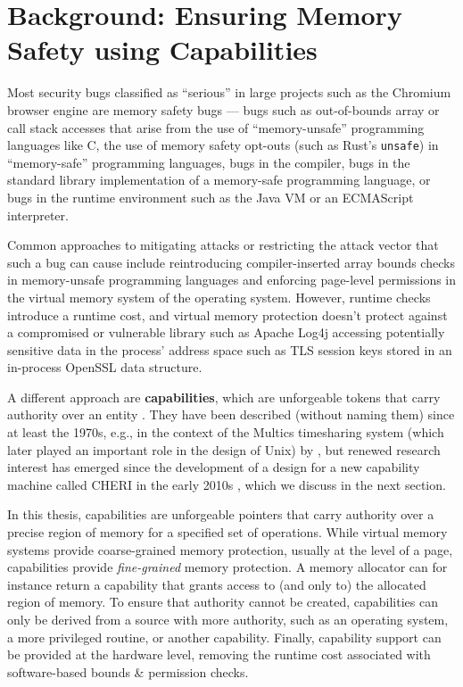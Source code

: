 \documentclass[main.tex]{subfiles}
\begin{document}
\onlyinsubfile{\mainmatter{}}

\chapter{Background: Ensuring Memory Safety using Capabilities} \label{ch:cheri}
Most security bugs classified as \enquote{serious} in large projects such as the Chromium browser engine are memory safety bugs \citep{chromium} — bugs such as out-of-bounds array or call stack accesses that arise from the use of \enquote{memory-unsafe} programming languages like C, the use of memory safety opt-outs (such as Rust’s \texttt{unsafe}) in \enquote{memory-safe} programming languages, bugs in the compiler, bugs in the standard library implementation of a memory-safe programming language, or bugs in the runtime environment such as the Java VM or an ECMAScript interpreter.

Common approaches to mitigating attacks or restricting the attack vector that such a bug can cause include reintroducing compiler-inserted array bounds checks in memory-unsafe programming languages and enforcing page-level permissions in the virtual memory system of the operating system. However, runtime checks introduce a runtime cost, and virtual memory protection doesn’t protect against a compromised or vulnerable library such as Apache Log4j accessing potentially sensitive data in the process’ address space such as TLS session keys stored in an in-process OpenSSL data structure.

A different approach are \textbf{capabilities}, which are unforgeable tokens that carry authority over an entity \citep[Section~1.1]{capsys}. They have been described (without naming them) since at least the 1970s, e.g., in the context of the Multics timesharing system (which later played an important role in the design of Unix) by \citet{multics}, but renewed research interest has emerged since the development of a design for a new capability machine called CHERI in the early 2010s \citep[Section~A.1 and Chapter~13]{cheri}, which we discuss in the next section.

In this thesis, capabilities are unforgeable pointers that carry authority over a precise region of memory for a specified set of operations. While virtual memory systems provide coarse-grained memory protection, usually at the level of a page, capabilities provide \emph{fine-grained} memory protection. A memory allocator can for instance return a capability that grants access to (and only to) the allocated region of memory. To ensure that authority cannot be created, capabilities can only be derived from a source with more authority, such as an operating system, a more privileged routine, or another capability. Finally, capability support can be provided at the hardware level, removing the runtime cost associated with software-based bounds \& permission checks.
\end{document}
